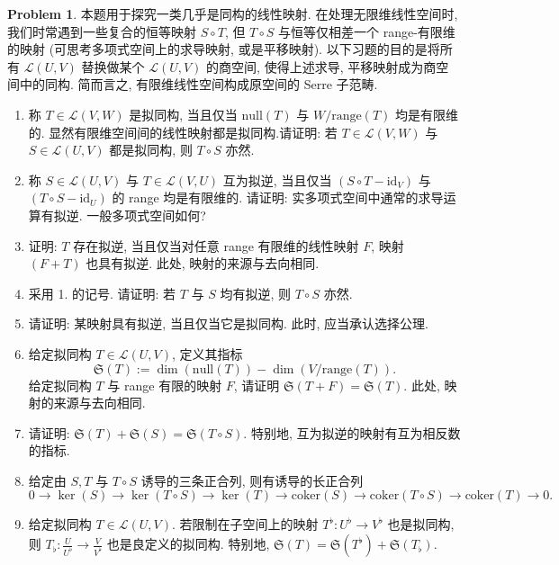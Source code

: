 \documentclass{MainStyle}
\theoremstyle{definition}
\newtheorem{problem}{Problem}
\begin{document}
\begin{problem}
本题用于探究一类几乎是同构的线性映射. 在处理无限维线性空间时, 我们时常遇到一些复合的恒等映射 $S\circ T$, 但 $T\circ S$ 与恒等仅相差一个 range-有限维的映射 (可思考多项式空间上的求导映射, 或是平移映射). 以下习题的目的是将所有 $\mathcal L(U,V)$ 替换做某个 $\mathcal L(U,V)$ 的商空间, 使得上述求导, 平移映射成为商空间中的同构. 简而言之, 有限维线性空间构成原空间的 Serre 子范畴.
\begin{enumerate}
    \item 称 $T\in \mathcal L(V, W)$ 是拟同构, 当且仅当 $\mathrm{null}(T)$ 与 $W/\mathrm{range}(T)$ 均是有限维的. 显然有限维空间间的线性映射都是拟同构.请证明: 若 $T\in \mathcal L(V, W)$ 与 $S\in \mathcal L(U,V)$ 都是拟同构, 则 $T\circ S$ 亦然.
    \item 称 $S\in \mathcal L(U,V)$ 与 $T\in \mathcal L(V,U)$ 互为拟逆, 当且仅当 $(S\circ T-\mathrm{id}_V)$ 与 $(T\circ S-\mathrm{id}_U)$ 的 range 均是有限维的. 请证明: 实多项式空间中通常的求导运算有拟逆. 一般多项式空间如何?
    \item 证明: $T$ 存在拟逆, 当且仅当对任意 range 有限维的线性映射 $F$, 映射 $(F+T)$ 也具有拟逆. 此处, 映射的来源与去向相同.
    \item 采用 1. 的记号. 请证明: 若 $T$ 与 $S$ 均有拟逆, 则 $T\circ S$ 亦然.
    \item 请证明: 某映射具有拟逆, 当且仅当它是拟同构. 此时, 应当承认选择公理.
    \item 给定拟同构 $T\in \mathcal L(U,V)$, 定义其指标
          \begin{equation}
              \mathfrak S(T):=\dim (\mathrm{null}(T))-\dim (V/\mathrm{range}(T)).
          \end{equation}
          给定拟同构 $T$ 与 range 有限的映射 $F$, 请证明 $\mathfrak S(T+F)=\mathfrak S(T)$. 此处, 映射的来源与去向相同.
    \item 请证明: $\mathfrak S(T)+\mathfrak S(S)=\mathfrak S(T\circ S)$. 特别地, 互为拟逆的映射有互为相反数的指标.
    \item 给定由 $S, T$ 与 $T\circ S$ 诱导的三条正合列, 则有诱导的长正合列
          \begin{equation}
              0\to \ker (S)\to \ker (T\circ S)\to \ker (T)\to \mathrm{coker}(S)\to \mathrm{coker}(T\circ S)\to \mathrm{coker}(T)\to 0.
          \end{equation}
    \item 给定拟同构 $T\in \mathcal L(U,V)$. 若限制在子空间上的映射 $T^\flat:U^\flat\to V^\flat$ 也是拟同构, 则 $T_\flat: \frac{U}{U^\flat}\to \frac{V}{V^\flat}$ 也是良定义的拟同构. 特别地, $\mathfrak S(T)=\mathfrak S(T^\flat)+\mathfrak S(T_\flat)$.

\end{enumerate}
\end{problem}
\end{document}
